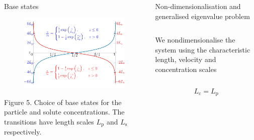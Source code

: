 \documentclass[final]{beamer} %
\begin{document}
\begin{frame}[t]
\begin{columns}[t]
\begin{column}{0.3\paperwidth}
\begin{block}{Base states}
        \begin{figure}
            \includegraphics[width=0.3\paperwidth]{base_state.pdf}
          \end{figure}

          \vspace{-1cm}

          \centering \footnotesize Figure 5. Choice of base states for the
          particle and solute concentrations. The transitions have length scales
          $L_{\text{p}}$ and $L_{\text{s}}$ respectively.
          
      \end{block}

    \end{column}

    \begin{column}{0.6\paperwidth}
      \begin{block}{Non-dimensionalisation and generalised eigenvalue problem}
        \begin{columns}[t]
          \begin{column}{0.21\paperwidth}
            \centering We nondimensionalise the system using the characteristic length, velocity and concentration scales

            \vspace{-2cm}
            
            \begin{columns}[t]
              \begin{column}{0.07\paperwidth}
                \centering
                
                $$ L_{\text{c}} = L_{\text{p}} $$
                

\end{column}
\end{columns}
\end{column}
\end{columns}
\end{block}
\end{column}
\end{columns}
\end{frame}
\end{document}
